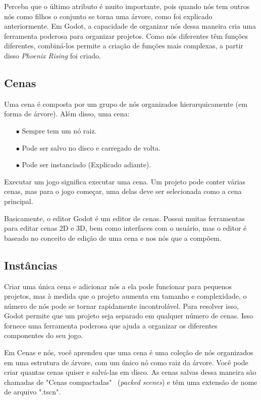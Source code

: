 Perceba que o último atributo é muito importante, pois quando nós tem outros nós
como filhos o conjunto se torna uma árvore, como foi explicado anteriormente.
Em Godot, a capacidade de organizar nós dessa maneira cria uma ferramenta 
poderosa para organizar projetos. Como nós diferentes têm funções diferentes, 
combiná-los permite a criação de funções mais complexas, a partir disso
\textit{Phoenix Rising} foi criado.

\subsection{Cenas}

Uma cena é composta por um grupo de nós organizados hierarquicamente 
(em forma de árvore). Além disso, uma cena:

\begin{itemize}
    \item[$\bullet$]
        Sempre tem um nó raiz.
    \item[$\bullet$]
        Pode ser salvo no disco e carregado de volta.
    \item[$\bullet$]
        Pode ser instanciado (Explicado adiante).
\end{itemize}

Executar um jogo significa executar uma cena. Um projeto pode conter várias 
cenas, mas para o jogo começar, uma delas deve ser selecionada como a cena 
principal.

Basicamente, o editor Godot é um editor de cenas. Possui muitas ferramentas para
editar cenas 2D e 3D, bem como interfaces com o usuário, mas o editor é baseado 
no conceito de edição de uma cena e nos nós que a compõem.

\subsection{Instâncias}

Criar uma única cena e adicionar nós a ela pode funcionar para pequenos 
projetos, mas à medida que o projeto aumenta em tamanho e complexidade, o número
de nós pode se tornar rapidamente incontrolável. Para resolver isso, Godot 
permite que um projeto seja separado em qualquer número de cenas. Isso fornece 
uma ferramenta poderosa que ajuda a organizar os diferentes componentes do seu
jogo.

Em Cenas e nós, você aprendeu que uma cena é uma coleção de nós organizados em 
uma estrutura de árvore, com um único nó como raiz da árvore.
Você pode criar quantas cenas quiser e salvá-las em disco. As cenas salvas dessa
maneira são chamadas de "Cenas compactadas" \ (\textit{packed scenes}) e têm uma 
extensão de nome de arquivo ".tscn".

